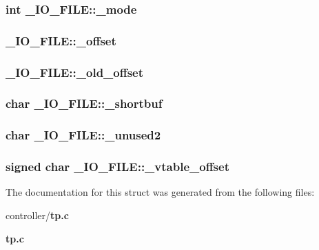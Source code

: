 \subsubsection[{\_\-mode}]{\setlength{\rightskip}{0pt plus 5cm}int {\bf \_\-IO\_\-FILE::\_\-mode}}\label{struct__IO__FILE_a5fcae29efb49dd2d3ea1fcd920daacfd}
\subsubsection[{\_\-offset}]{ {\bf \_\-IO\_\-FILE::\_\-offset}}\label{struct__IO__FILE_a6984cd80575532a12da307fd776cbe21}
\subsubsection[{\_\-old\_\-offset}]{ {\bf \_\-IO\_\-FILE::\_\-old\_\-offset}}\label{struct__IO__FILE_a06993119321415a42d87a60117971bb5}
\subsubsection[{\_\-shortbuf}]{\setlength{\rightskip}{0pt plus 5cm}char {\bf \_\-IO\_\-FILE::\_\-shortbuf}}\label{struct__IO__FILE_a93a64646816443e509390088d6480844}
\subsubsection[{\_\-unused2}]{\setlength{\rightskip}{0pt plus 5cm}char {\bf \_\-IO\_\-FILE::\_\-unused2}}\label{struct__IO__FILE_add2be926ca3c141f3a2d215f7c52ee18}
\subsubsection[{\_\-vtable\_\-offset}]{\setlength{\rightskip}{0pt plus 5cm}signed char {\bf \_\-IO\_\-FILE::\_\-vtable\_\-offset}}\label{struct__IO__FILE_ac503f09304dc1fa00d54b97ffcf77afa}


The documentation for this struct was generated from the following files:\begin{DoxyCompactItemize}
\item 
controller/{\bf tp.c}\item 
{\bf tp.c}\end{DoxyCompactItemize}
